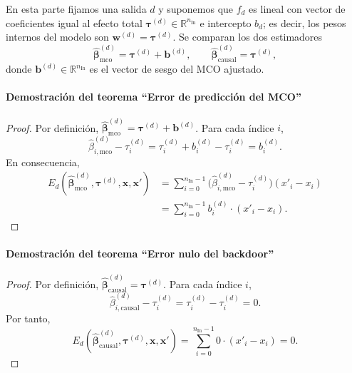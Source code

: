 \documentclass[12pt]{report} %
\begin{document}
En esta parte fijamos una salida $d$ y suponemos que $f_d$ es lineal con vector de coeficientes igual al efecto total $\boldsymbol{\tau}^{(d)} \in \mathbb{R}^{n_{\text{In}}}$ e intercepto $b_d$; es decir, los pesos internos del modelo son $\mathbf{w}^{(d)} = \boldsymbol{\tau}^{(d)}$. Se comparan los dos estimadores
$$\widehat{\boldsymbol{\beta}}^{(d)}_{\text{mco}} = \boldsymbol{\tau}^{(d)} + \mathbf{b}^{(d)}, \qquad \widehat{\boldsymbol{\beta}}^{(d)}_{\text{causal}} = \boldsymbol{\tau}^{(d)},$$
donde $\mathbf{b}^{(d)} \in \mathbb{R}^{n_{\text{In}}}$ es el vector de sesgo del MCO ajustado.

\paragraph*{Demostración del teorema ``Error de predicción del MCO''}
\begin{proof}
    Por definición, $\widehat{\boldsymbol{\beta}}_{\text{mco}}^{(d)} = \boldsymbol{\tau}^{(d)} + \mathbf{b}^{(d)}$. Para cada índice $i$,
    $$\widehat{\beta}_{i,\text{mco}}^{(d)} - \tau_i^{(d)} = \tau_i^{(d)} + b_i^{(d)} - \tau_i^{(d)} = b_i^{(d)}.$$
    En consecuencia,
    \begin{align*}
        E_d\!\left(\widehat{\boldsymbol{\beta}}^{(d)}_{\text{mco}}, \boldsymbol{\tau}^{(d)}, \mathbf{x}, \mathbf{x}'\right)
         & = \sum_{i=0}^{n_{\text{In}}-1} \bigl(\widehat{\beta}_{i,\text{mco}}^{(d)} - \tau_i^{(d)}\bigr)(x'_i - x_i) \\
         & = \sum_{i=0}^{n_{\text{In}}-1} b_i^{(d)} \cdot (x'_i - x_i).
    \end{align*}
\end{proof}

\paragraph*{Demostración del teorema ``Error nulo del backdoor''}
\begin{proof}
    Por definición, $\widehat{\boldsymbol{\beta}}_{\text{causal}}^{(d)} = \boldsymbol{\tau}^{(d)}$. Para cada índice $i$,
    $$\widehat{\beta}_{i,\text{causal}}^{(d)} - \tau_i^{(d)} = \tau_i^{(d)} - \tau_i^{(d)} = 0.$$
    Por tanto,
    $$E_d\!\left(\widehat{\boldsymbol{\beta}}^{(d)}_{\text{causal}}, \boldsymbol{\tau}^{(d)}, \mathbf{x}, \mathbf{x}'\right) = \sum_{i=0}^{n_{\text{In}}-1} 0 \cdot (x'_i - x_i) = 0.$$
\end{proof}
\end{document}
